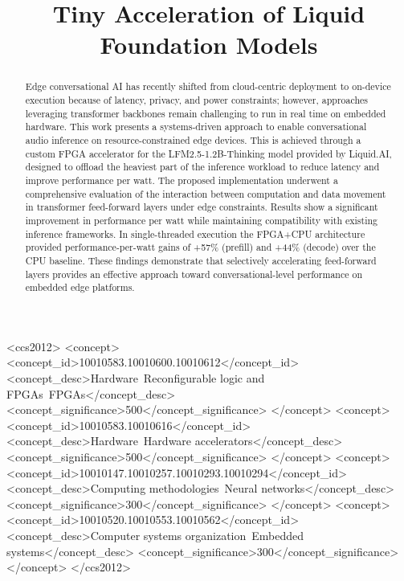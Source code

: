 \documentclass[manuscript,]{acmart} %
\title{Tiny Acceleration of Liquid Foundation Models}
\begin{document}
\begin{abstract}

Edge conversational AI has recently shifted from cloud-centric deployment to on-device execution because of latency, privacy, and power constraints; however, approaches leveraging transformer backbones remain challenging to run in real time on embedded hardware.
This work presents a systems-driven approach to enable conversational audio inference on resource-constrained edge devices. This is achieved through a custom FPGA accelerator for the LFM2.5-1.2B-Thinking model provided by Liquid.AI, designed to offload the heaviest part of the inference workload to reduce latency and improve performance per watt. The proposed implementation underwent a comprehensive evaluation of the interaction between computation and data movement in transformer feed-forward layers under edge constraints. Results show a significant improvement in performance per watt while maintaining compatibility with existing inference frameworks. In single-threaded execution the FPGA+CPU architecture provided performance-per-watt gains of +57\% (prefill) and +44\% (decode) over the CPU baseline.
These findings demonstrate that selectively accelerating feed-forward layers provides an effective approach toward conversational-level performance on embedded edge platforms. 


\end{abstract}


\maketitle

\begin{CCSXML}
<ccs2012>
<concept>
<concept_id>10010583.10010600.10010612</concept_id>
<concept_desc>Hardware~Reconfigurable logic and FPGAs~FPGAs</concept_desc>
<concept_significance>500</concept_significance>
</concept>
<concept>
<concept_id>10010583.10010616</concept_id>
<concept_desc>Hardware~Hardware accelerators</concept_desc>
<concept_significance>500</concept_significance>
</concept>
<concept>
<concept_id>10010147.10010257.10010293.10010294</concept_id>
<concept_desc>Computing methodologies~Neural networks</concept_desc>
<concept_significance>300</concept_significance>
</concept>
<concept>
<concept_id>10010520.10010553.10010562</concept_id>
<concept_desc>Computer systems organization~Embedded systems</concept_desc>
<concept_significance>300</concept_significance>
</concept>
</ccs2012>
\end{CCSXML}
\end{document}
